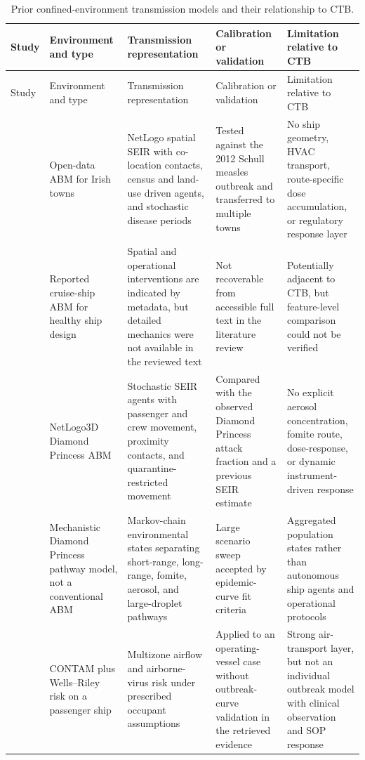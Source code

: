{\small\setlength{\tabcolsep}{3pt}\begin{longtable}{p{}p{}p{}p{}p{}}
\caption{Prior confined-environment transmission models and their relationship to CTB.}\label{tab:confined-abm-comparison}\\
\toprule
Study & Environment and type & Transmission representation & Calibration or validation & Limitation relative to CTB \\
\midrule
\endfirsthead
\toprule
Study & Environment and type & Transmission representation & Calibration or validation & Limitation relative to CTB \\
\midrule
\endhead
\citet{Hunter2018OpenDataABM} & Open-data ABM for Irish towns & NetLogo spatial SEIR with co-location contacts, census and land-use driven agents, and stochastic disease periods & Tested against the 2012 Schull measles outbreak and transferred to multiple towns & No ship geometry, HVAC transport, route-specific dose accumulation, or regulatory response layer \\
\citet{Pan2026HealthyCruiseShip} & Reported cruise-ship ABM for healthy ship design & Spatial and operational interventions are indicated by metadata, but detailed mechanics were not available in the reviewed text & Not recoverable from accessible full text in the literature review & Potentially adjacent to CTB, but feature-level comparison could not be verified \\
\citet{Rankin2022DiamondPrincessABM} & NetLogo3D Diamond Princess ABM & Stochastic SEIR agents with passenger and crew movement, proximity contacts, and quarantine-restricted movement & Compared with the observed Diamond Princess attack fraction and a previous SEIR estimate & No explicit aerosol concentration, fomite route, dose-response, or dynamic instrument-driven response \\
\citet{Azimi2021DiamondPrincess} & Mechanistic Diamond Princess pathway model, not a conventional ABM & Markov-chain environmental states separating short-range, long-range, fomite, aerosol, and large-droplet pathways & Large scenario sweep accepted by epidemic-curve fit criteria & Aggregated population states rather than autonomous ship agents and operational protocols \\
\citet{Xia2023CONTAMCruiseShip} & CONTAM plus Wells--Riley risk on a passenger ship & Multizone airflow and airborne-virus risk under prescribed occupant assumptions & Applied to an operating-vessel case without outbreak-curve validation in the retrieved evidence & Strong air-transport layer, but not an individual outbreak model with clinical observation and SOP response \\

\end{longtable}}
